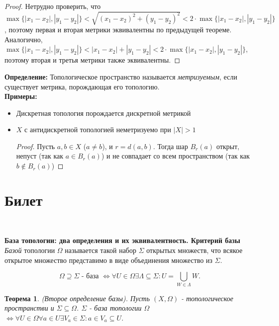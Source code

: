 \documentclass[a4paper,100pt]{article}
\theoremstyle{indented}
\newtheorem{theorem}{Теорема}
\begin{document}
\begin{proof} Нетрудно проверить, что $\max\{|x_1-x_2|, |y_1-y_2|\}<\sqrt{(x_1-x_2)^2+(y_1-y_2)^2} < 2 \cdot \max\{|x_1-x_2|, |y_1-y_2|\}$, поэтому первая и вторая метрики эквивалентны по предыдущей теореме. Аналогично, $\max\{|x_1-x_2|, |y_1-y_2|\}< |x_1-x_2|+|y_1-y_2| < 2 \cdot \max\{|x_1-x_2|, |y_1-y_2|\}$, поэтому вторая и третья метрики также эквивалентны.
\end{proof}

\textbf{Определение: } Топологическое пространство называется \textit{метризуемым}, если существует метрика, порождающая его топологию.
\\

\textbf{Примеры: } 
\begin{itemize}
    \item Дискретная топология порождается дискретной метрикой 
    \item $X$ с антидискретной топологией неметризуемо при $|X|>1$
    
    \begin{proof} Пусть $a, b \in X$ ($a \neq b$), и $r=d(a, b)$. Тогда шар $B_r(a)$ открыт, непуст (так как $a \in B_r(a)$) и не совпадает со всем пространством (так как $b \notin B_r(a)$)
    \end{proof}
\end{itemize}

\section{Билет} \

\medskip

\textbf{База топологии: два определения и их эквивалентность. Критерий базы}\\

\textit{Базой} топологии $\Omega$ называется такой набор $\Sigma$ открытых множеств, что всякое открытое множество представимо в виде объединения множество из $\Sigma$.

\[
    \Omega \supseteq \Sigma \text{ - база } \Leftrightarrow \forall U \in \Omega \exists \Lambda \subseteq \Sigma : U = \bigcup_{W\in \Lambda} W.
\]

\begin{theorem}
    (Второе определение базы). Пусть $(X, \Omega)$ - топологическое пространстви и $\Sigma \subseteq \Omega$. $\Sigma$ - база топологии $\Omega$ $\Longleftrightarrow \forall U \in \Omega \forall a \in U \exists V_a \in \Sigma : a\in V_a \subseteq U$.
\end{theorem}
\end{document}

